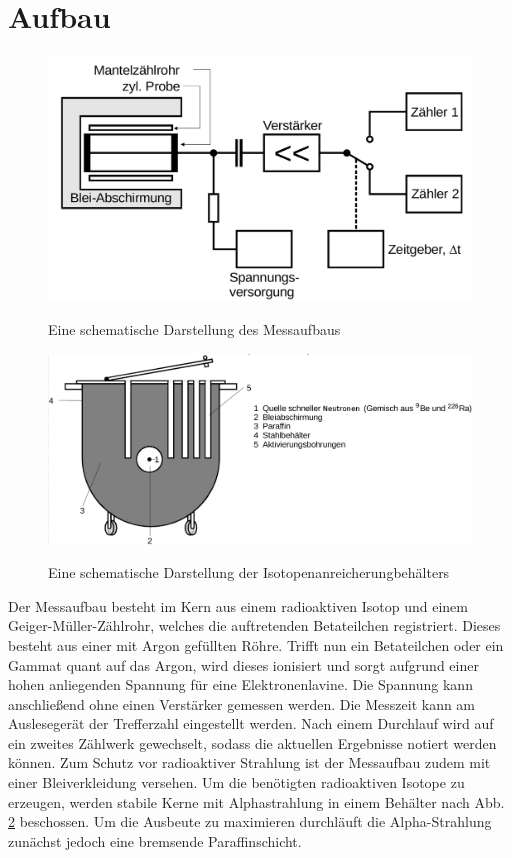 \section{Aufbau}
\label{sec:Aufbau}

\begin{figure}
 \centering
 \caption{Eine schematische Darstellung des Messaufbaus \cite{V702}}
 \includegraphics[width=\linewidth-70pt,height=\textheight-70pt,keepaspectratio]{content/aufbau.png}
 \label{fig:aufbau}
\end{figure}

\begin{figure}
 \centering
 \caption{Eine schematische Darstellung der Isotopenanreicherungbehälters \cite{V702}}
 \includegraphics[width=\linewidth-70pt,height=\textheight-70pt,keepaspectratio]{content/kochtopf.png}
 \label{fig:topf}
\end{figure}


Der Messaufbau besteht im Kern aus einem radioaktiven Isotop und einem
 Geiger-Müller-Zählrohr, welches die auftretenden Betateilchen registriert. Dieses besteht aus einer mit Argon gefüllten Röhre. Trifft nun ein Betateilchen oder ein Gammat
 quant auf das Argon, wird dieses ionisiert und sorgt aufgrund einer hohen anliegenden Spannung für eine Elektronenlavine. Die Spannung kann anschließend ohne einen Verstärker gemessen werden. Die Messzeit kann am Auslesegerät der Trefferzahl eingestellt werden. Nach einem Durchlauf wird auf ein zweites Zählwerk gewechselt, sodass die aktuellen Ergebnisse notiert werden können. Zum Schutz vor radioaktiver Strahlung ist der Messaufbau zudem mit einer Bleiverkleidung versehen. Um die benötigten radioaktiven Isotope zu erzeugen, werden stabile Kerne mit Alphastrahlung in einem Behälter nach Abb. \ref{fig:topf} beschossen. Um die Ausbeute zu maximieren durchläuft die Alpha-Strahlung zunächst jedoch eine bremsende Paraffinschicht.
